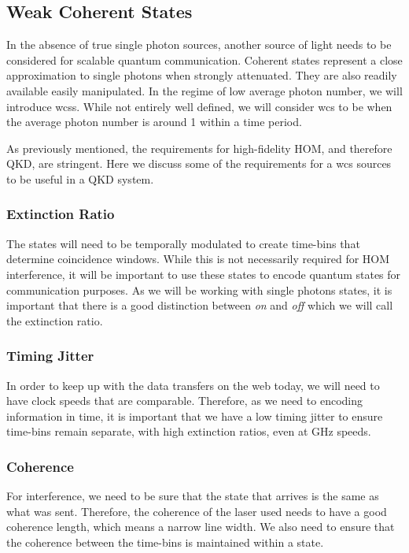 \subsection{Weak Coherent States}

In the absence of true single photon sources, another source of light needs to be considered for scalable quantum communication. Coherent states represent a close approximation to single photons when strongly attenuated. They are also readily available easily manipulated. In the regime of low average photon number, we will introduce \acp{wcs}. While not entirely well defined, we will consider \ac{wcs} to be when the average photon number is around 1 within a time period.

As previously mentioned, the requirements for high-fidelity \ac{HOM}, and therefore \ac{QKD}, are stringent. Here we discuss some of the requirements for a \ac{wcs} sources to be useful in a \ac{QKD} system. 

\subsubsection*{Extinction Ratio}

The states will need to be temporally modulated to create time-bins that determine coincidence windows. While this is not necessarily required for \ac{HOM} interference, it will be important to use these states to encode quantum states for communication purposes. As we will be working with single photons states, it is important that there is a good distinction between \textit{on} and \textit{off} which we will call the extinction ratio. 

\subsubsection*{Timing Jitter}

In order to keep up with the data transfers on the web today, we will need to have clock speeds that are comparable. Therefore, as we need to encoding information in time, it is important that we have a low timing jitter to ensure time-bins remain separate, with high extinction ratios, even at GHz speeds.

\subsubsection*{Coherence}

For interference, we need to be sure that the state that arrives is the same as what was sent. Therefore, the coherence of the laser used needs to have a good coherence length, which means a narrow line width. We also need to ensure that the coherence between the time-bins is maintained within a state.

